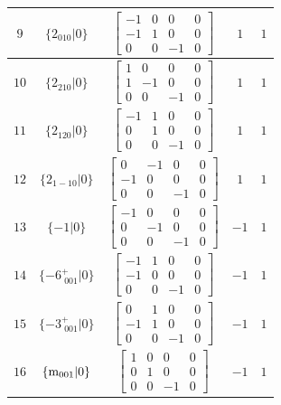 \documentclass[fleqn,8pt]{jsarticle}
\begin{document}
\begin{longtable}{ccccc}
$ 9 $ & $ \{2{}_{010}|0\} $ & $ \begin{bmatrix} -1 & 0 & 0 & 0 \\ -1 & 1 & 0 & 0 \\ 0 & 0 & -1 & 0 \end{bmatrix} $ & $ 1 $ & $ 1 $ \\ \hline
$ 10 $ & $ \{2{}_{210}|0\} $ & $ \begin{bmatrix} 1 & 0 & 0 & 0 \\ 1 & -1 & 0 & 0 \\ 0 & 0 & -1 & 0 \end{bmatrix} $ & $ 1 $ & $ 1 $ \\ \hline
$ 11 $ & $ \{2{}_{120}|0\} $ & $ \begin{bmatrix} -1 & 1 & 0 & 0 \\ 0 & 1 & 0 & 0 \\ 0 & 0 & -1 & 0 \end{bmatrix} $ & $ 1 $ & $ 1 $ \\ \hline
$ 12 $ & $ \{2{}_{1-10}|0\} $ & $ \begin{bmatrix} 0 & -1 & 0 & 0 \\ -1 & 0 & 0 & 0 \\ 0 & 0 & -1 & 0 \end{bmatrix} $ & $ 1 $ & $ 1 $ \\ \hline
$ 13 $ & $ \{-1|0\} $ & $ \begin{bmatrix} -1 & 0 & 0 & 0 \\ 0 & -1 & 0 & 0 \\ 0 & 0 & -1 & 0 \end{bmatrix} $ & $ -1 $ & $ 1 $ \\ \hline
$ 14 $ & $ \{-6^{+}_{\,\,001}|0\} $ & $ \begin{bmatrix} -1 & 1 & 0 & 0 \\ -1 & 0 & 0 & 0 \\ 0 & 0 & -1 & 0 \end{bmatrix} $ & $ -1 $ & $ 1 $ \\ \hline
$ 15 $ & $ \{-3^{+}_{\,\,001}|0\} $ & $ \begin{bmatrix} 0 & 1 & 0 & 0 \\ -1 & 1 & 0 & 0 \\ 0 & 0 & -1 & 0 \end{bmatrix} $ & $ -1 $ & $ 1 $ \\ \hline
$ 16 $ & $ \{{\rm m}_{001}|0\} $ & $ \begin{bmatrix} 1 & 0 & 0 & 0 \\ 0 & 1 & 0 & 0 \\ 0 & 0 & -1 & 0 \end{bmatrix} $ & $ -1 $ & $ 1 $ \\ \hline

\end{longtable}
\end{document}
